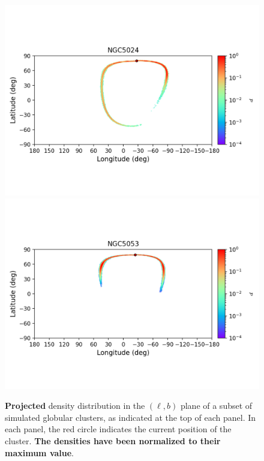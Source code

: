 \begin{figure}
        \includegraphics[clip=true, trim = 0mm 20mm 0mm 10mm, width=1\columnwidth]{images/error_plots_NGC5024.png}
        \includegraphics[clip=true, trim = 0mm 20mm 0mm 10mm, width=1\columnwidth]{images/error_plots_NGC5053.png}
        \caption[]{\textbf{Projected} density distribution in the $(\ell, b)$ plane of a subset of simulated globular clusters, as indicated at the top of each panel. In each panel, the red circle indicates the current position of the cluster. \textbf{The densities have been normalized to their maximum value}.}\label{stream5}
        \end{figure}
